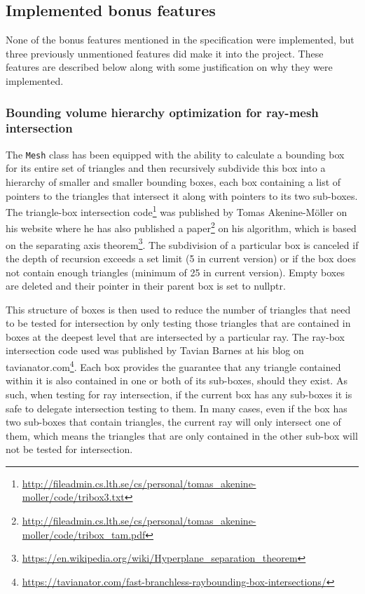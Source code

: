 \documentclass[a4paper,11pt]{article}
\begin{document}
\subsection{Implemented bonus features}
None of the bonus features mentioned in the specification were implemented, but three
previously unmentioned features did make it into the project. These features are described
below along with some justification on why they were implemented.

\subsubsection{Bounding volume hierarchy optimization for ray-mesh intersection}
The \texttt{Mesh} class has been equipped with the ability to calculate a bounding box for its entire
set of triangles and then recursively subdivide this box into a hierarchy of smaller and
smaller bounding boxes, each box containing a list of pointers to the
triangles that intersect it along with pointers to its two sub-boxes. The triangle-box intersection
code\footnote{\url{http://fileadmin.cs.lth.se/cs/personal/tomas_akenine-moller/code/tribox3.txt}}
was published by Tomas Akenine-Möller on his website where he has also published a
paper\footnote{\url{http://fileadmin.cs.lth.se/cs/personal/tomas_akenine-moller/code/tribox\_tam.pdf}}
on his algorithm, which is based on the separating axis
theorem\footnote{\url{https://en.wikipedia.org/wiki/Hyperplane\_separation\_theorem}}. The
subdivision of a particular box is canceled if the depth of recursion exceeds a set limit
(5 in current version) or if the box does not contain enough triangles (minimum of 25 in
current version). Empty boxes are deleted and their pointer in their parent box is set
to nullptr.

This structure of boxes is then used to reduce the number of triangles that need to be tested
for intersection by only testing those triangles that are contained in boxes at the deepest
level that are intersected by a particular ray. The ray-box intersection code used was published
by Tavian Barnes at his blog on tavianator.com\footnote{\url{https://tavianator.com/fast-branchless-raybounding-box-intersections/}}.
Each box provides the guarantee that any triangle contained within it is also contained in one or
both of its sub-boxes, should they exist. As such, when testing for ray intersection, if the current
box has any sub-boxes it is safe to delegate intersection testing to them. In many cases, even if
the box has two sub-boxes that contain triangles, the current ray will only intersect one of them,
which means the triangles that are only contained in the other sub-box will not be tested for intersection.
\end{document}
